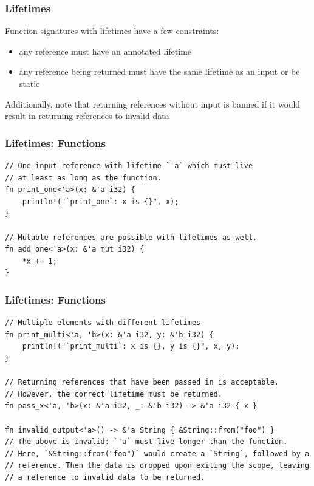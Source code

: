 \documentclass[aspectratio=1610,t]{beamer}
\begin{document}

\begin{frame}[fragile]
\frametitle{Lifetimes}
Function signatures with lifetimes have a few constraints:
\begin{itemize}
    \item any reference must have an annotated lifetime
    \item any reference being returned must have the same lifetime as an input or be static
\end{itemize}

Additionally, note that returning references without input is banned if it would result in returning references to invalid data
\end{frame}


\begin{frame}[fragile]
\frametitle{Lifetimes: Functions}
\begin{verbatim}
// One input reference with lifetime `'a` which must live
// at least as long as the function.
fn print_one<'a>(x: &'a i32) {
    println!("`print_one`: x is {}", x);
}

// Mutable references are possible with lifetimes as well.
fn add_one<'a>(x: &'a mut i32) {
    *x += 1;
}
\end{verbatim}
\end{frame}


\begin{frame}[fragile]
\frametitle{Lifetimes: Functions}
\begin{verbatim}
// Multiple elements with different lifetimes
fn print_multi<'a, 'b>(x: &'a i32, y: &'b i32) {
    println!("`print_multi`: x is {}, y is {}", x, y);
}

// Returning references that have been passed in is acceptable.
// However, the correct lifetime must be returned.
fn pass_x<'a, 'b>(x: &'a i32, _: &'b i32) -> &'a i32 { x }

fn invalid_output<'a>() -> &'a String { &String::from("foo") }
// The above is invalid: `'a` must live longer than the function.
// Here, `&String::from("foo")` would create a `String`, followed by a
// reference. Then the data is dropped upon exiting the scope, leaving
// a reference to invalid data to be returned.
\end{verbatim}
\end{frame}
\end{document}
